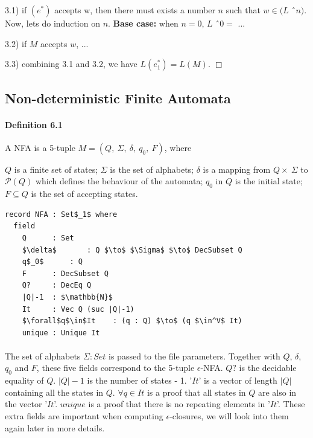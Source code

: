 \documentclass[twoside,openright,final]{bhamthesis}
\renewcommand{\item}{\itemindent0.5cm\itemold}
\begin{document}
\par 3.1) if \((e^*)\) accepts w, then there must exists a number
\(n\) such that \(w \in (L\) \^\ \(n)\). Now, lets do induction on
\(n\). \textbf{Base case:} when \(n = 0\), \(L\) \^\ \(0 = \) ...

\par 3.2) if \(M\) accepts \(w\), ... 

\par 3.3) combining 3.1 and 3.2, we have \(L(e_1^*) =
L(M)\). \(\Box\)

\subsection{Non-deterministic Finite Automata}

\paragraph{Definition 6.1} A NFA is a 5-tuple \(M = (Q
,\ \Sigma,\ \delta,\ q_0,\ F)\), where
\begin{enumerate}[nolistsep]
  \item \(Q\) is a finite set of states;
  \item \(\Sigma\) is the set of alphabets;
  \item \(\delta\) is a mapping from \(Q \times\ \Sigma\) to
    \(\mathcal P \left({Q}\right)\) which defines the behaviour of the automata;
  \item \(q_0\) in \(Q\) is the initial state;
  \item \(F \subseteq Q\) is the set of accepting states. 
\end{enumerate}
\vspace{0.7pc}
\begin{lstlisting}[caption=NFA,mathescape=true]
record NFA : Set$_1$ where
  field
    Q      : Set
    $\delta$       : Q $\to$ $\Sigma$ $\to$ DecSubset Q
    q$_0$      : Q
    F      : DecSubset Q
    Q?     : DecEq Q
    |Q|-1  : $\mathbb{N}$
    It     : Vec Q (suc |Q|-1)
    $\forall$q$\in$It    : (q : Q) $\to$ (q $\in^V$ It)
    unique : Unique It
\end{lstlisting}
\paragraph{} The set of alphabets \(\Sigma : Set\) is passed to the file
parameters. Together with \(Q\), \(\delta\),
\(q_0\) and \(F\), these five fields correspond to the 5-tuple
\(\epsilon\)-NFA. \(Q?\) is
the decidable equality of \(Q\). \(|Q|-1\) is the number of states -
1. '\(It\)' is a vector of length \(|Q|\) containing all the
states in \(Q\). \(\forall q\in It\) is a
proof that all states in \(Q\) are also in the vector
'\(It\)'. \(unique\) is a proof that there is no repeating elements in
'\(It\)'. These extra fields are important when computing
\(\epsilon\)-closures, we will look into them again later in more
details.  
\end{document}
